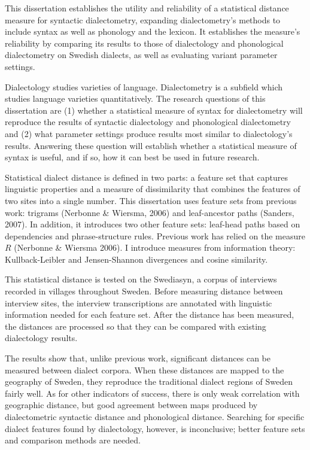  This dissertation establishes the utility and reliability of a
  statistical distance measure for syntactic dialectometry, expanding
  dialectometry's methods to include syntax as well as phonology and
  the lexicon. It establishes the measure's reliability by comparing
  its results to those of dialectology and phonological dialectometry
  on Swedish dialects, as well as evaluating variant parameter
  settings.

  Dialectology studies varieties of language. Dialectometry is a
  subfield which studies language varieties quantitatively. The
  research questions of this dissertation are (1) whether a
  statistical measure of syntax for dialectometry will reproduce the
  results of syntactic dialectology and phonological dialectometry and
  (2) what parameter settings produce results most similar to
  dialectology's results. Answering these question will establish
  whether a statistical measure of syntax is useful, and if so, how it
  can best be used in future research.

  Statistical dialect distance is defined in two parts: a feature set
  that captures linguistic properties and a measure of dissimilarity
  that combines the features of two sites into a single number.  This
  dissertation uses feature sets from previous work: trigrams
  (Nerbonne \& Wiersma, 2006) and leaf-ancestor paths (Sanders,
  2007). In addition, it introduces two other feature sets: leaf-head
  paths based on dependencies and phrase-structure rules. Previous
  work has relied on the measure $R$ (Nerbonne \& Wiersma
  2006). I introduce measures from information theory:
  Kullback-Leibler and Jensen-Shannon divergences and cosine
  similarity.

  This statistical distance is tested on the Swediasyn, a corpus of
  interviews recorded in villages throughout Sweden. Before measuring
  distance between interview sites, the interview transcriptions
  are annotated with linguistic information needed for each feature
  set. After the distance has been measured, the distances are
  processed so that they can be compared with existing
  dialectology results.

  The results show that, unlike previous work, significant distances
  can be measured between dialect corpora. When these distances are
  mapped to the geography of Sweden, they reproduce the traditional
  dialect regions of Sweden fairly well. As for other indicators of
  success, there is only weak correlation with geographic distance,
  but good agreement between maps produced by dialectometric syntactic
  distance and phonological distance. Searching for specific dialect
  features found by dialectology, however, is inconclusive; better
  feature sets and comparison methods are needed.
